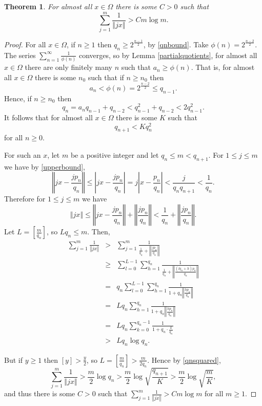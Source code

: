 \documentclass{article}
\newcommand{\norm}[1]{\left\Vert #1 \right\Vert}
\newtheorem{theorem}{Theorem}
\begin{document}
\begin{theorem}
For almost all $x \in \Omega$ there is some $C>0$ such that
\[
\sum_{j=1}^m \frac{1}{\norm{jx}} > C m \log m.
\]
\label{omegabound}
\end{theorem}
\begin{proof}
For all $x \in \Omega$, if $n \geq 1$ then $q_n \geq 2^{\frac{n-1}{2}}$, by \eqref{qnbound}. Take $\phi(n)=2^{\frac{n-2}{2}}$. The series $\sum_{n=1}^\infty \frac{1}{\phi(n)}$ converges, so by Lemma \ref{partialquotients}, for almost all $x \in \Omega$ there are only finitely many $n$ such that  $a_n \geq \phi(n)$. That is, for almost all $x \in \Omega$ there is some $n_0$ such that if $n \geq n_0$ then
\[
a_n<\phi(n) =2^{\frac{n-2}{2}} \leq q_{n-1}.
\]
Hence, if $n \geq n_0$ then
\[
q_n = a_n q_{n-1}+q_{n-2} < q_{n-1}^2+q_{n-2}< 2 q_{n-1}^2.
\]
It follows that for almost all $x \in \Omega$ there is some $K$ such that
\begin{equation}
q_{n+1} < K q_n^2
\label{qnsquared}
\end{equation}
for all $n \geq 0$.

For such an $x$, let $m$ be a positive integer and let $q_n \leq m < q_{n+1}$. For $1 \leq j \leq m$ we have by \eqref{upperbound},
\[
\norm{jx-\frac{jp_n}{q_n}} \leq \left| jx-\frac{jp_n}{q_n} \right|=j  \left| x-\frac{p_n}{q_n} \right| < \frac{j}{q_n q_{n+1}}
< \frac{1}{q_n}.
\]
Therefore for $1 \leq j \leq m$ we have
\[
\norm{jx} \leq \norm{jx-\frac{jp_n}{q_n}}+ \norm{\frac{jp_n}{q_n}}<\frac{1}{q_n}+\norm{\frac{jp_n}{q_n}}.
\]
Let $L=[ \frac{m}{q_n} ]$, so $Lq_n \leq m$. Then,
\begin{eqnarray*}
\sum_{j=1}^m \frac{1}{\norm{jx}}&>&\sum_{j=1}^m \frac{1}{\frac{1}{q_n}+\norm{\frac{jp_n}{q_n}}}\\
&\geq&\sum_{l=0}^{L-1} \sum_{h=1}^{q_n} \frac{1}{\frac{1}{q_n}+\norm{\frac{(lq_n+h)p_n}{q_n}}}\\
&=&q_n \sum_{l=0}^{L-1} \sum_{h=1}^{q_n} \frac{1}{1+q_n\norm{\frac{hp_n}{q_n}}}\\
&=&Lq_n  \sum_{h=1}^{q_n} \frac{1}{1+q_n\norm{\frac{hp_n}{q_n}}}\\
&=&Lq_n \sum_{k=0}^{q_n-1} \frac{1}{1+q_n\cdot \frac{k}{q_n}}\\
&>&Lq_n \log q_n.
\end{eqnarray*}

But if $y\geq 1$ then $[ y ] > \frac{y}{2}$, so $L=[ \frac{m}{q_n} ] > \frac{m}{2q_n}$. Hence by \eqref{qnsquared},
\[
\sum_{j=1}^m \frac{1}{\norm{jx}} > \frac{m}{2} \log q_n > \frac{m}{2} \log \sqrt{\frac{q_{n+1}}{K}} > 
\frac{m}{2} \log \sqrt{\frac{m}{K}},
\]
and thus there is some $C>0$ such that $\sum_{j=1}^m \frac{1}{\norm{jx}} > C m \log m$ for all $m \geq 1$.
\end{proof}
\end{document}
